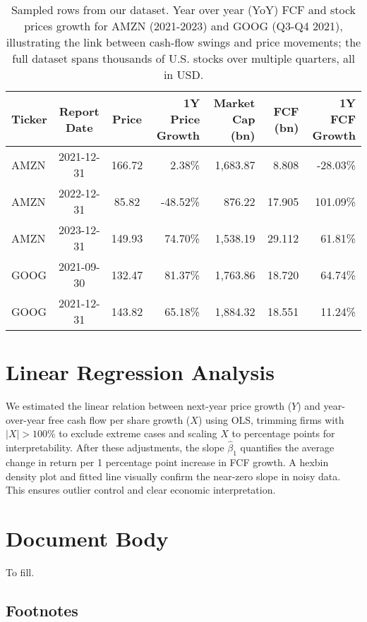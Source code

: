 \documentclass[11pt]{article}
\begin{document}
\begin{table*}[h]
  \setlength{\tabcolsep}{4pt}
  \centering
\caption{Sampled rows from our dataset. Year over year (YoY) FCF and stock prices growth for AMZN (2021-2023) and GOOG (Q3-Q4 2021), illustrating the link between cash-flow swings and price movements; the full dataset spans thousands of U.S. stocks over multiple quarters, all in USD.}
  \label{tab:sample-data}
  \begin{tabular}{lccrrrr}
    \toprule
    Ticker & Report Date & Price & 1Y Price Growth & Market Cap (bn) & FCF (bn) & 1Y FCF Growth \\
    \midrule
    AMZN & 2021-12-31 & 166.72 & 2.38\%   & 1,683.87 &  8.808 &  -28.03\% \\
    AMZN & 2022-12-31 &  85.82 & -48.52\% &   876.22 & 17.905 &  101.09\% \\
    AMZN & 2023-12-31 & 149.93 & 74.70\%  & 1,538.19 & 29.112 &   61.81\% \\
    \midrule
    GOOG & 2021-09-30 & 132.47 & 81.37\%  & 1,763.86 & 18.720 &   64.74\% \\
    GOOG & 2021-12-31 & 143.82 & 65.18\%  & 1,884.32 & 18.551 &   11.24\% \\
    \bottomrule
  \end{tabular}
\end{table*}

\section{Linear Regression Analysis}

We estimated the linear relation between next-year price growth ($Y$) and year-over-year free cash flow per share growth ($X$) using OLS, trimming firms with $|X|>100\%$ to exclude extreme cases and scaling $X$ to percentage points for interpretability. After these adjustments, the slope $\hat\beta_1$ quantifies the average change in return per 1 percentage point increase in FCF growth. A hexbin density plot and fitted line visually confirm the near-zero slope in noisy data. This ensures outlier control and clear economic interpretation.

\section{Document Body}

To fill.

\subsection{Footnotes}
\end{document}
